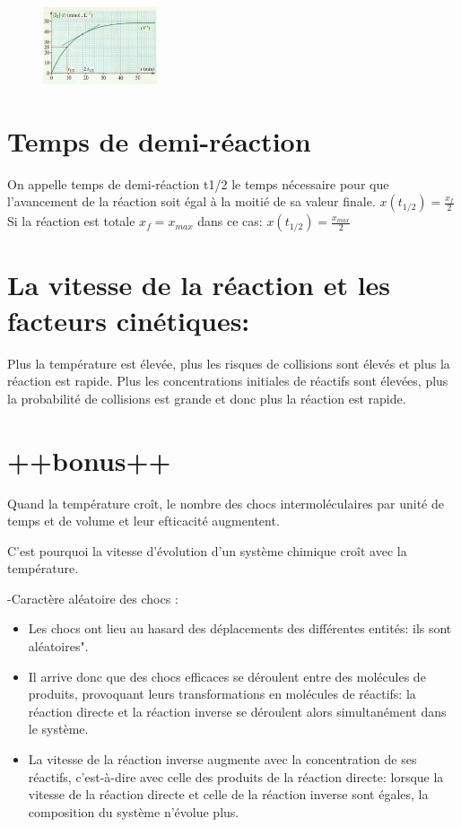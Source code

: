 \documentclass[12pt]{article}
\begin{document}
\begin{figure}
	\vspace{-3cm}
	\includegraphics[width=0.3\textwidth]{./img/STdemi_rection.png}
\end{figure}

\section*{Temps de demi-réaction}
On appelle temps de demi-réaction t1/2 le temps nécessaire pour que l'avancement de la réaction soit égal à la moitié de sa valeur finale. $x(t_{1/2}) = \frac{x_f}{2}$
Si la réaction est totale $x_f=x_{max}$ dans ce cas: $x(t_{1/2}) = \frac{x_{max}}{2}$ 

\section*{La vitesse de la réaction et les facteurs cinétiques: }
Plus la température est élevée, plus les risques de collisions sont élevés et plus la réaction est rapide.
Plus les concentrations initiales de réactifs sont élevées, plus la probabilité de collisions est grande et donc plus la réaction est
rapide.
\section*{++bonus++}
Quand la température croît, le nombre des chocs intermoléculaires par unité de temps et de volume et leur efticacité augmentent.

C'est pourquoi la vitesse d'évolution d'un système chimique croît avec la température.

-Caractère aléatoire des chocs : 
\begin{itemize}
	\item Les chocs ont lieu au hasard des déplacements des différentes entités: ils
sont aléatoires".

\item Il arrive donc que des chocs efficaces se déroulent entre des molécules de
produits, provoquant leurs transformations en molécules de réactifs: la
réaction directe et la réaction inverse se déroulent alors simultanément dans
le système.

\item La vitesse de la réaction inverse augmente avec la concentration de ses
réactifs, c'est-à-dire avec celle des produits de la réaction directe: lorsque la
vitesse de la réaction directe et celle de la réaction inverse sont égales, la
composition du système n'évolue plus.

\end{itemize}
\end{document}
